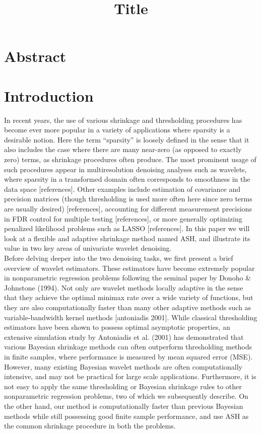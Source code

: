 \documentclass[12pt]{article}
\begin{document}
\title{\textbf{Title}}
\date{}
\maketitle

\section{Abstract}
\section{Introduction}
In recent years, the use of various shrinkage and thresholding procedures has become ever more popular in a variety of applications where sparsity is a desirable notion. Here the term ``sparsity'' is loosely defined in the sense that it also includes the case where there are many near-zero (as opposed to exactly zero) terms, as shrinkage procedures often produce. The most prominent usage of such procedures appear in multiresolution denoising analyses such as wavelets, where sparsity in a transformed domain often corresponds to smoothness in the data space [references]. Other examples include estimation of covariance and precision matrices (though thresholding is used more often here since zero terms are usually desired) [references], accounting for different measurement precisions in FDR control for multiple testing [references], or more generally optimizing penalized likelihood problems such as LASSO [references]. In this paper we will look at a flexible and adaptive shrinkage method named ASH, and illustrate its value in two key areas of univariate wavelet denoising.\bigskip\\
Before delving deeper into the two denoising tasks, we first present a brief overview of wavelet estimators. These estimators have become extremely popular in nonparametric regression problems following the seminal paper by Donoho \& Johnstone (1994). Not only are wavelet methods locally adaptive in the sense that they achieve the optimal minimax rate over a wide variety of functions, but they are also computationally faster than many other adaptive methods such as variable-bandwidth kernel methods [antoniadis 2001]. While classical thresholding estimators have been shown to possess optimal asymptotic properties, an extensive simulation study by Antoniadis et al. (2001) has demonstrated that various Bayesian shrinkage methods can often outperform thresholding methods in finite samples, where performance is measured by mean squared error (MSE). However, many existing Bayesian wavelet methods are often computationally intensive, and may not be practical for large scale applications. Furthermore, it is not easy to apply the same thresholding or Bayesian shrinkage rules to other nonparametric regression problems, two of which we subsequently describe. On the other hand, our method is computationally faster than previous Bayesian methods while still possessing good finite sample performance, and use ASH as the common shrinkage procedure in both the problems.\bigskip\\
\end{document}
